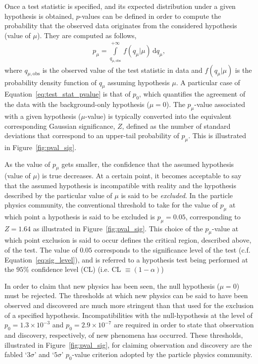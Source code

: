 Once a test statistic is specified, and its expected distribution under a given hypothesis is obtained,
$p$-values can be defined in order to compute the probability that the observed data originates from the
considered hypothesis (value of $\mu$).
They are computed as follows,
\begin{align}
    p_{\mu} = \int\limits_{q_{\mu, \text{obs}}}^{+\infty} \, f(q_{\mu} | \mu) \, \mathrm{d}q_{\mu},
    \label{eq:test_stat_pvalue}
\end{align}
where $q_{\mu, \text{obs}}$ is the observed value of the test statistic in data and $f(q_{\mu} | \mu)$ is the probability
density function of $q_{\mu}$ assuming hypothesis $\mu$.
A particular case of Equation~\ref{eq:test_stat_pvalue} is that of $p_0$, which quantifies the agreement of the data with the background-only
hypothesis ($\mu = 0$).
The $p_{\mu}$-value associated with a given hypothesis ($\mu$-value) is typically converted into the equivalent corresponding Gaussian significance, $Z$, defined
as the number of standard deviations that correspond to an upper-tail probability of $p_{\mu}$.
This is illustrated in Figure~\ref{fig:pval_sig}.

As the value of $p_{\mu}$ gets smaller, the confidence that the assumed hypothesis (value of $\mu$) is true
decreases.
At a certain point, it becomes acceptable to say that the assumed hypothesis is incompatible with
reality and the hypothesis described by the particular value of $\mu$ is said to be \textit{excluded}.
In the particle physics community, the conventional threshold to take for the value of $p_{\mu}$
at which point a hypothesis is said to be excluded is $p_{\mu} = 0.05$, corresponding to $Z=1.64$ as
illustrated in Figure~\ref{fig:pval_sig}.
This choice of the $p_{\mu}$-value at which point exclusion is said to occur defines
the critical region, described above, of the test.
The value of $0.05$ corresponds to the significance level of the test (c.f. Equation~\ref{eq:sig_level}), and is referred
to a hypothesis test being performed at the $95\%$ confidence level (CL) (i.e. CL $\equiv (1-\alpha)$)

In order to claim that new physics has been seen, the null hypothesis ($\mu = 0$) must be rejected.
The thresholds at which new physics can be said to have been observed and discovered are
much more stringent than that used for the exclusion of a specified hypothesis.
Incompatibilities with the null-hypothesis at the level of $p_0 = 1.3 \times 10^{-3}$ and
$p_0 = 2.9\times 10^{-7}$ are required in order to state that observation and discovery, respectively,
of new phenomena has occurred.
These thresholds, illustrated in Figure~\ref{fig:pval_sig}, for claiming observation and discovery are the fabled `$3\sigma$' and `$5\sigma$'
$p_0$-value criterion adopted by the particle physics community.

